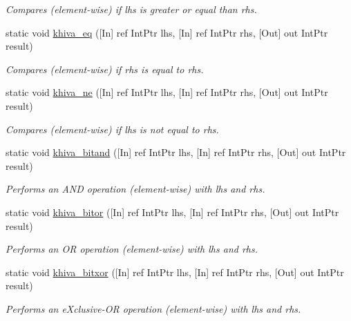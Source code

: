 \begin{DoxyCompactItemize}
\begin{DoxyCompactList}\small\item\em Compares (element-\/wise) if lhs is greater or equal than rhs.\end{DoxyCompactList}\item 
static void \mbox{\hyperlink{classkhiva_1_1interop_1_1_d_l_l_array_a8e3ac336f9c4f3fa31928a5f95e1c9bf}{khiva\+\_\+eq}} (\mbox{[}In\mbox{]} ref Int\+Ptr lhs, \mbox{[}In\mbox{]} ref Int\+Ptr rhs, \mbox{[}Out\mbox{]} out Int\+Ptr result)
\begin{DoxyCompactList}\small\item\em Compares (element-\/wise) if rhs is equal to rhs.\end{DoxyCompactList}\item 
static void \mbox{\hyperlink{classkhiva_1_1interop_1_1_d_l_l_array_aa7036f8f9ef7dc3b5746ac74717d0452}{khiva\+\_\+ne}} (\mbox{[}In\mbox{]} ref Int\+Ptr lhs, \mbox{[}In\mbox{]} ref Int\+Ptr rhs, \mbox{[}Out\mbox{]} out Int\+Ptr result)
\begin{DoxyCompactList}\small\item\em Compares (element-\/wise) if lhs is not equal to rhs.\end{DoxyCompactList}\item 
static void \mbox{\hyperlink{classkhiva_1_1interop_1_1_d_l_l_array_a39e8611822e9b44fcbd4a8c6a584c301}{khiva\+\_\+bitand}} (\mbox{[}In\mbox{]} ref Int\+Ptr lhs, \mbox{[}In\mbox{]} ref Int\+Ptr rhs, \mbox{[}Out\mbox{]} out Int\+Ptr result)
\begin{DoxyCompactList}\small\item\em Performs an A\+ND operation (element-\/wise) with lhs and rhs.\end{DoxyCompactList}\item 
static void \mbox{\hyperlink{classkhiva_1_1interop_1_1_d_l_l_array_a5e1513736d93714a206bf002651700b3}{khiva\+\_\+bitor}} (\mbox{[}In\mbox{]} ref Int\+Ptr lhs, \mbox{[}In\mbox{]} ref Int\+Ptr rhs, \mbox{[}Out\mbox{]} out Int\+Ptr result)
\begin{DoxyCompactList}\small\item\em Performs an OR operation (element-\/wise) with lhs and rhs.\end{DoxyCompactList}\item 
static void \mbox{\hyperlink{classkhiva_1_1interop_1_1_d_l_l_array_a75af15beca66bc413e5763f106379cd9}{khiva\+\_\+bitxor}} (\mbox{[}In\mbox{]} ref Int\+Ptr lhs, \mbox{[}In\mbox{]} ref Int\+Ptr rhs, \mbox{[}Out\mbox{]} out Int\+Ptr result)
\begin{DoxyCompactList}\small\item\em Performs an e\+Xclusive-\/\+OR operation (element-\/wise) with lhs and rhs.\end{DoxyCompactList}\item 

\end{DoxyCompactItemize}
